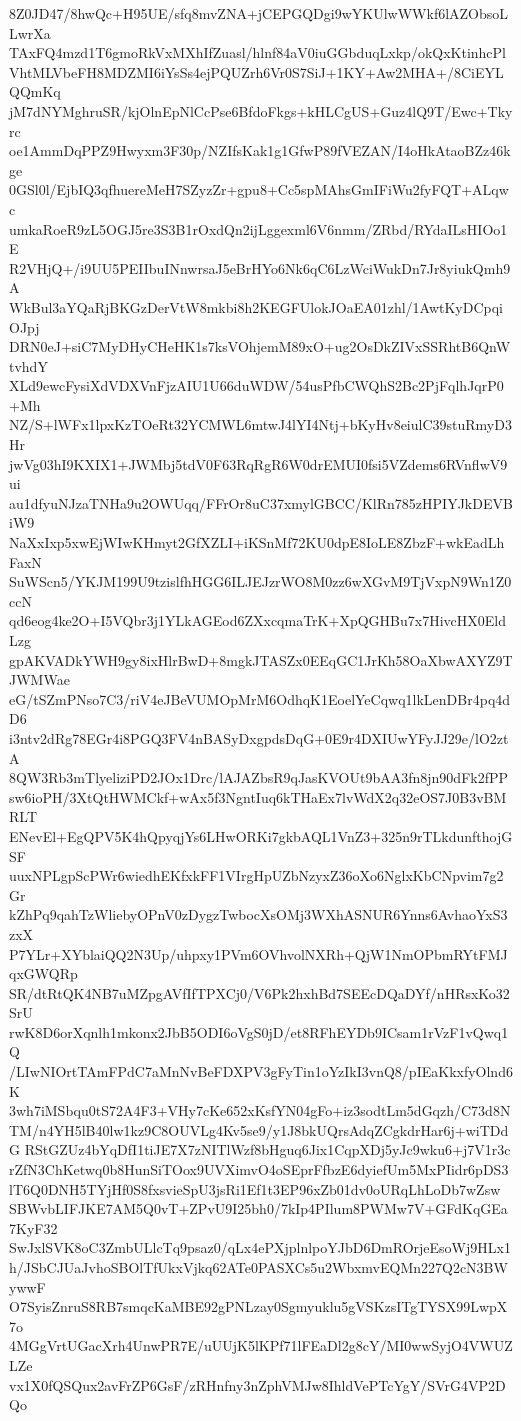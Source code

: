 8Z0JD47/8hwQc+H95UE/sfq8mvZNA+jCEPGQDgi9wYKUlwWWkf6lAZObsoLLwrXa
TAxFQ4mzd1T6gmoRkVxMXhIfZuasl/hlnf84aV0iuGGbduqLxkp/okQxKtinhcPl
VhtMLVbeFH8MDZMI6iYsSs4ejPQUZrh6Vr0S7SiJ+1KY+Aw2MHA+/8CiEYLQQmKq
jM7dNYMghruSR/kjOlnEpNlCcPse6BfdoFkgs+kHLCgUS+Guz4lQ9T/Ewc+Tkyrc
oe1AmmDqPPZ9Hwyxm3F30p/NZIfsKak1g1GfwP89fVEZAN/I4oHkAtaoBZz46kge
0GSl0l/EjbIQ3qfhuereMeH7SZyzZr+gpu8+Cc5spMAhsGmIFiWu2fyFQT+ALqwc
umkaRoeR9zL5OGJ5re3S3B1rOxdQn2ijLggexml6V6nmm/ZRbd/RYdaILsHIOo1E
R2VHjQ+/i9UU5PEIIbuINnwrsaJ5eBrHYo6Nk6qC6LzWciWukDn7Jr8yiukQmh9A
WkBul3aYQaRjBKGzDerVtW8mkbi8h2KEGFUlokJOaEA01zhl/1AwtKyDCpqiOJpj
DRN0eJ+siC7MyDHyCHeHK1s7ksVOhjemM89xO+ug2OsDkZIVxSSRhtB6QnWtvhdY
XLd9ewcFysiXdVDXVnFjzAIU1U66duWDW/54usPfbCWQhS2Bc2PjFqlhJqrP0+Mh
NZ/S+lWFx1lpxKzTOeRt32YCMWL6mtwJ4lYI4Ntj+bKyHv8eiulC39stuRmyD3Hr
jwVg03hI9KXIX1+JWMbj5tdV0F63RqRgR6W0drEMUI0fsi5VZdems6RVnflwV9ui
au1dfyuNJzaTNHa9u2OWUqq/FFrOr8uC37xmylGBCC/KlRn785zHPIYJkDEVBiW9
NaXxIxp5xwEjWIwKHmyt2GfXZLI+iKSnMf72KU0dpE8IoLE8ZbzF+wkEadLhFaxN
SuWScn5/YKJM199U9tzislfhHGG6ILJEJzrWO8M0zz6wXGvM9TjVxpN9Wn1Z0ccN
qd6eog4ke2O+I5VQbr3j1YLkAGEod6ZXxcqmaTrK+XpQGHBu7x7HivcHX0EldLzg
gpAKVADkYWH9gy8ixHlrBwD+8mgkJTASZx0EEqGC1JrKh58OaXbwAXYZ9TJWMWae
eG/tSZmPNso7C3/riV4eJBeVUMOpMrM6OdhqK1EoelYeCqwq1lkLenDBr4pq4dD6
i3ntv2dRg78EGr4i8PGQ3FV4nBASyDxgpdsDqG+0E9r4DXIUwYFyJJ29e/lO2ztA
8QW3Rb3mTlyeliziPD2JOx1Drc/lAJAZbsR9qJasKVOUt9bAA3fn8jn90dFk2fPP
sw6ioPH/3XtQtHWMCkf+wAx5f3NgntIuq6kTHaEx7lvWdX2q32eOS7J0B3vBMRLT
ENevEl+EgQPV5K4hQpyqjYs6LHwORKi7gkbAQL1VnZ3+325n9rTLkdunfthojGSF
uuxNPLgpScPWr6wiedhEKfxkFF1VIrgHpUZbNzyxZ36oXo6NglxKbCNpvim7g2Gr
kZhPq9qahTzWliebyOPnV0zDygzTwbocXsOMj3WXhASNUR6Ynns6AvhaoYxS3zxX
P7YLr+XYblaiQQ2N3Up/uhpxy1PVm6OVhvolNXRh+QjW1NmOPbmRYtFMJqxGWQRp
SR/dtRtQK4NB7uMZpgAVfIfTPXCj0/V6Pk2hxhBd7SEEcDQaDYf/nHRsxKo32SrU
rwK8D6orXqnlh1mkonx2JbB5ODI6oVgS0jD/et8RFhEYDb9ICsam1rVzF1vQwq1Q
/LIwNIOrtTAmFPdC7aMnNvBeFDXPV3gFyTin1oYzIkI3vnQ8/pIEaKkxfyOlnd6K
3wh7iMSbqu0tS72A4F3+VHy7cKe652xKsfYN04gFo+iz3sodtLm5dGqzh/C73d8N
TM/n4YH5lB40lw1kz9C8OUVLg4Kv5se9/y1J8bkUQrsAdqZCgkdrHar6j+wiTDdG
RStGZUz4bYqDfI1tiJE7X7zNITlWzf8bHguq6Jix1CqpXDj5yJc9wku6+j7V1r3c
rZfN3ChKetwq0b8HunSiTOox9UVXimvO4oSEprFfbzE6dyiefUm5MxPIidr6pDS3
lT6Q0DNH5TYjHf0S8fxsvieSpU3jsRi1Ef1t3EP96xZb01dv0oURqLhLoDb7wZsw
SBWvbLIFJKE7AM5Q0vT+ZPvU9I25bh0/7kIp4PIlum8PWMw7V+GFdKqGEa7KyF32
SwJxlSVK8oC3ZmbULlcTq9psaz0/qLx4ePXjplnlpoYJbD6DmROrjeEsoWj9HLx1
h/JSbCJUaJvhoSBOlTfUkxVjkq62ATe0PASXCs5u2WbxmvEQMn227Q2cN3BWywwF
O7SyisZnruS8RB7smqcKaMBE92gPNLzay0Sgmyuklu5gVSKzsITgTYSX99LwpX7o
4MGgVrtUGacXrh4UnwPR7E/uUUjK5lKPf71lFEaDl2g8cY/MI0wwSyjO4VWUZLZe
vx1X0fQSQux2avFrZP6GsF/zRHnfny3nZphVMJw8IhldVePTcYgY/SVrG4VP2DQo
